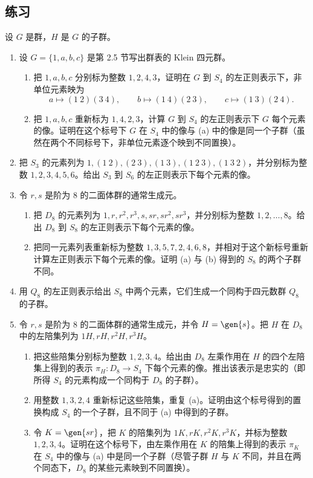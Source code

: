 \subsection*{练习}
设 $G$ 是群，$H$ 是 $G$ 的子群。
\begin{enumerate}[label=\arabic*.]
  \item 设 $G=\{1,a,b,c\}$ 是第 2.5 节写出群表的 Klein 四元群。
  \begin{enumerate}[label=(\alph*)]
    \item 把 $1,a,b,c$ 分别标为整数 $1,2,4,3$，证明在 $G$ 到 $S_4$ 的左正则表示下，非单位元素映为
    \[
      a\mapsto(1\ 2)(3\ 4),\qquad b\mapsto(1\ 4)(2\ 3),\qquad c\mapsto(1\ 3)(2\ 4).
    \]
    \item 把 $1,a,b,c$ 重新标为 $1,4,2,3$，计算 $G$ 到 $S_4$ 的左正则表示下 $G$ 每个元素的像。证明在这个标号下 $G$ 在 $S_4$ 中的像与 (a) 中的像是同一个子群（虽然在两个不同标号下，非单位元素逐个映到不同置换）。
  \end{enumerate}
  \item 把 $S_3$ 的元素列为 $1,(1\ 2),(2\ 3),(1\ 3),(1\ 2\ 3),(1\ 3\ 2)$，并分别标为整数 $1,2,3,4,5,6$。给出 $S_3$ 到 $S_6$ 的左正则表示下每个元素的像。
  \item 令 $r,s$ 是阶为 $8$ 的二面体群的通常生成元。
  \begin{enumerate}[label=(\alph*)]
    \item 把 $D_8$ 的元素列为 $1,r,r^2,r^3,s,sr,sr^2,sr^3$，并分别标为整数 $1,2,\ldots,8$。给出 $D_8$ 到 $S_8$ 的左正则表示下每个元素的像。
    \item 把同一元素列表重新标为整数 $1,3,5,7,2,4,6,8$，并相对于这个新标号重新计算左正则表示下每个元素的像。证明 (a) 与 (b) 得到的 $S_8$ 的两个子群不同。
  \end{enumerate}
  \item 用 $Q_8$ 的左正则表示给出 $S_8$ 中两个元素，它们生成一个同构于四元数群 $Q_8$ 的子群。
  \item 令 $r,s$ 是阶为 $8$ 的二面体群的通常生成元，并令 $H=\gen{s}$。把 $H$ 在 $D_8$ 中的左陪集列为 $1H,rH,r^2H,r^3H$。
  \begin{enumerate}[label=(\alph*)]
    \item 把这些陪集分别标为整数 $1,2,3,4$。给出由 $D_8$ 左乘作用在 $H$ 的四个左陪集上得到的表示 $\pi_H:D_8\to S_4$ 下每个元素的像。推出该表示是忠实的（即所得 $S_4$ 的元素构成一个同构于 $D_8$ 的子群）。
    \item 用整数 $1,3,2,4$ 重新标记这些陪集，重复 (a)。证明由这个标号得到的置换构成 $S_4$ 的一个子群，且不同于 (a) 中得到的子群。
    \item 令 $K=\gen{sr}$，把 $K$ 的陪集列为 $1K,rK,r^2K,r^3K$，并标为整数 $1,2,3,4$。证明在这个标号下，由左乘作用在 $K$ 的陪集上得到的表示 $\pi_K$ 在 $S_4$ 中的像与 (a) 中是同一个子群（尽管子群 $H$ 与 $K$ 不同，并且在两个同态下，$D_8$ 的某些元素映到不同置换）。

\end{enumerate}
\end{enumerate}
